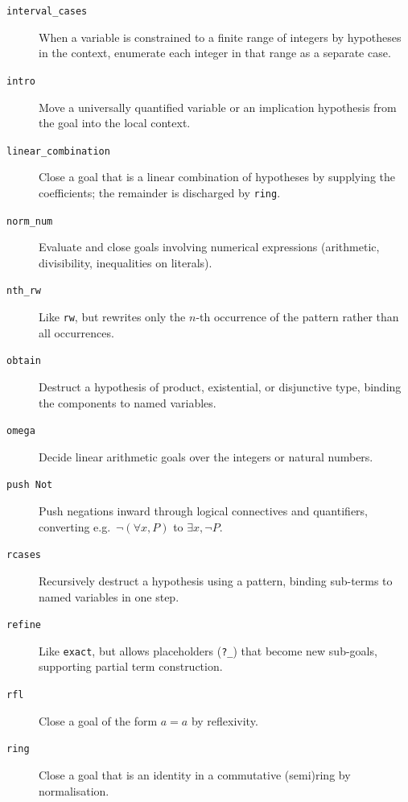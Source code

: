 \documentclass{amsart}
\begin{document}
\begin{description}
  \item[\texttt{interval\_cases}]
    When a variable is constrained to a finite range of integers by
    hypotheses in the context, enumerate each integer in that range as a
    separate case.

  \item[\texttt{intro}]
    Move a universally quantified variable or an implication hypothesis
    from the goal into the local context.

  \item[\texttt{linear\_combination}]
    Close a goal that is a linear combination of hypotheses by supplying
    the coefficients; the remainder is discharged by \texttt{ring}.

  \item[\texttt{norm\_num}]
    Evaluate and close goals involving numerical expressions (arithmetic,
    divisibility, inequalities on literals).

  \item[\texttt{nth\_rw}]
    Like \texttt{rw}, but rewrites only the \(n\)-th occurrence of the
    pattern rather than all occurrences.

  \item[\texttt{obtain}]
    Destruct a hypothesis of product, existential, or disjunctive type,
    binding the components to named variables.

  \item[\texttt{omega}]
    Decide linear arithmetic goals over the integers or natural numbers.

  \item[\texttt{push Not}]
    Push negations inward through logical connectives and quantifiers,
    converting e.g.\ $\neg(\forall x, P)$ to $\exists x, \neg P$.

  \item[\texttt{rcases}]
    Recursively destruct a hypothesis using a pattern, binding sub-terms
    to named variables in one step.

  \item[\texttt{refine}]
    Like \texttt{exact}, but allows placeholders (\texttt{?\_}) that
    become new sub-goals, supporting partial term construction.

  \item[\texttt{rfl}]
    Close a goal of the form $a = a$ by reflexivity.

  \item[\texttt{ring}]
    Close a goal that is an identity in a commutative (semi)ring by
    normalisation.


\end{description}
\end{document}
